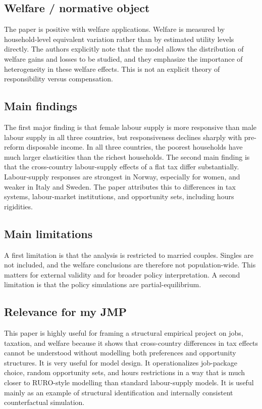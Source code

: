 \documentclass[11pt,a4paper]{article}
\begin{document}
\subsection*{Welfare / normative object}
The paper is positive with welfare applications. Welfare is measured by household-level equivalent variation rather than by estimated utility levels directly. The authors explicitly note that the model allows the distribution of welfare gains and losses to be studied, and they emphasize the importance of heterogeneity in these welfare effects. This is not an explicit theory of responsibility versus compensation.

\subsection*{Main findings}
The first major finding is that female labour supply is more responsive than male labour supply in all three countries, but responsiveness declines sharply with pre-reform disposable income. In all three countries, the poorest households have much larger elasticities than the richest households. The second main finding is that the cross-country labour-supply effects of a flat tax differ substantially. Labour-supply responses are strongest in Norway, especially for women, and weaker in Italy and Sweden. The paper attributes this to differences in tax systems, labour-market institutions, and opportunity sets, including hours rigidities.

\subsection*{Main limitations}
A first limitation is that the analysis is restricted to married couples. Singles are not included, and the welfare conclusions are therefore not population-wide. This matters for external validity and for broader policy interpretation. A second limitation is that the policy simulations are partial-equilibrium.

\subsection*{Relevance for my JMP}
This paper is highly useful for framing a structural empirical project on jobs, taxation, and welfare because it shows that cross-country differences in tax effects cannot be understood without modelling both preferences and opportunity structures. It is very useful for model design. It operationalizes job-package choice, random opportunity sets, and hours restrictions in a way that is much closer to RURO-style modelling than standard labour-supply models. It is useful mainly as an example of structural identification and internally consistent counterfactual simulation.
\end{document}
